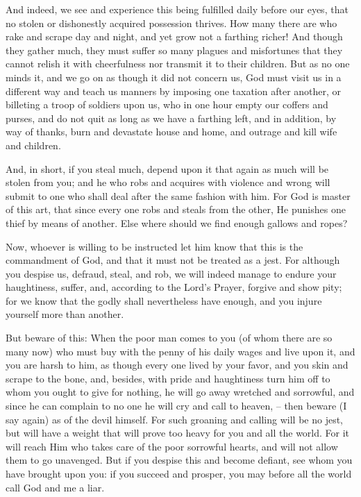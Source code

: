 And indeed, we see and experience this being fulfilled daily before our
eyes, that no stolen or dishonestly acquired possession thrives. How
many there are who rake and scrape day and night, and yet grow not a
farthing richer! And though they gather much, they must suffer so many
plagues and misfortunes that they cannot relish it with cheerfulness
nor transmit it to their children. But as no one minds it, and we go on
as though it did not concern us, God must visit us in a different way
and teach us manners by imposing one taxation after another, or
billeting a troop of soldiers upon us, who in one hour empty our
coffers and purses, and do not quit as long as we have a farthing
left, and in addition, by way of thanks, burn and devastate house and
home, and outrage and kill wife and children.

And, in short, if you steal much, depend upon it that again as much
will be stolen from you; and he who robs and acquires with violence and
wrong will submit to one who shall deal after the same fashion with
him. For God is master of this art, that since every one robs and
steals from the other, He punishes one thief by means of another. Else
where should we find enough gallows and ropes?

Now, whoever is willing to be instructed let him know that this is the
commandment of God, and that it must not be treated as a jest. For
although you despise us, defraud, steal, and rob, we will indeed manage
to endure your haughtiness, suffer, and, according to the Lord's
Prayer, forgive and show pity; for we know that the godly shall
nevertheless have enough, and you injure yourself more than another.

But beware of this: When the poor man comes to you (of whom there are
so many now) who must buy with the penny of his daily wages and live
upon it, and you are harsh to him, as though every one lived by your
favor, and you skin and scrape to the bone, and, besides, with pride
and haughtiness turn him off to whom you ought to give for nothing, he
will go away wretched and sorrowful, and since he can complain to no
one he will cry and call to heaven, -- then beware (I say again) as of
the devil himself. For such groaning and calling will be no jest, but
will have a weight that will prove too heavy for you and all the
world. For it will reach Him who takes care of the poor sorrowful
hearts, and will not allow them to go unavenged. But if you despise
this and become defiant, see whom you have brought upon you: if you
succeed and prosper, you may before all the world call God and me a
liar.

